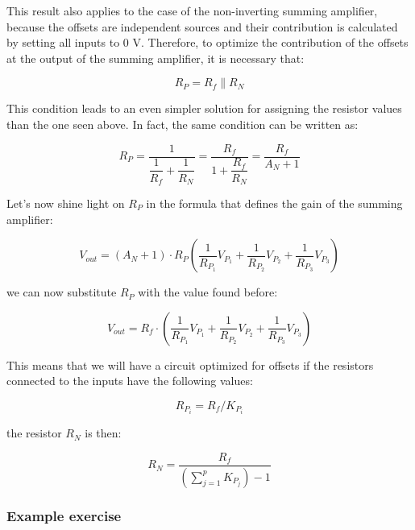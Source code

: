 \documentclass[../main.tex]{subfiles}
\begin{document}
This result also applies to the case of the non-inverting summing amplifier, because the offsets are independent sources and their contribution is calculated by setting all inputs to 0 V. Therefore, to optimize the contribution of the offsets at the output of the summing amplifier, it is necessary that:

\begin{equation}
	R_P = R_f \| R_N
\end{equation}

This condition leads to an even simpler solution for assigning the resistor values than the one seen above. In fact, the same condition can be written as:

\begin{equation}
	R_P = \dfrac{1}{\dfrac{1}{R_f} + \dfrac{1}{R_N}} = \frac{R_f}{1 + \dfrac{R_f}{R_N}} = \frac{R_f}{A_N + 1}
\end{equation}

Let's now shine light on $R_P$ in the formula that defines the gain of the summing amplifier:

\begin{equation}
	V_{out} = (A_N + 1) \cdot R_P \left( \frac{1}{R_{P_1}} V_{P_1} +  \frac{1}{R_{P_2}} V_{P_2} + \frac{1}{R_{P_3}} V_{P_3} \right)
\end{equation}

we can now substitute $R_P$ with the value found before:

\begin{equation}
	V_{out} = R_f \cdot \left( \frac{1}{R_{P_1}} V_{P_1} +  \frac{1}{R_{P_2}} V_{P_2} + \frac{1}{R_{P_3}} V_{P_3} \right)
\end{equation}


This means that we will have a circuit optimized for offsets if the resistors connected to the inputs have the following values:

\begin{equation}
	R_{P_i} = R_f / K_{P_i}
\end{equation}

the resistor $R_N$ is then:

\begin{equation}
	R_N = \frac{R_f}{\left( \sum_{j=1}^p K_{P_j} \right) - 1}
\end{equation}



\subsubsection*{Example exercise}
\end{document}
